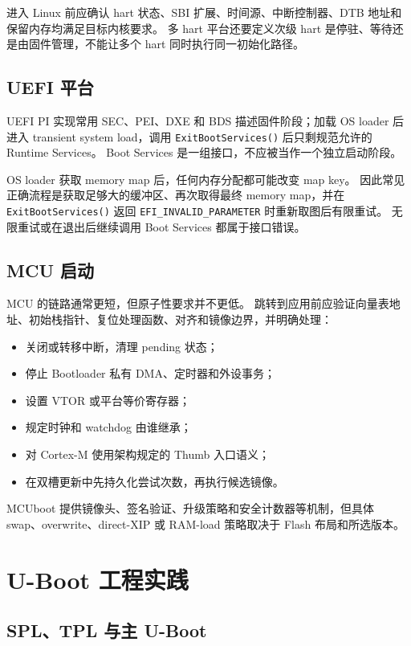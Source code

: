 进入 Linux 前应确认 hart 状态、SBI 扩展、时间源、中断控制器、DTB 地址和保留内存均满足目标内核要求\cite{linux-riscv-booting}。
多 hart 平台还要定义次级 hart 是停驻、等待还是由固件管理，不能让多个 hart 同时执行同一初始化路径。

\subsection{UEFI 平台}

UEFI PI 实现常用 SEC、PEI、DXE 和 BDS 描述固件阶段；加载 OS loader 后进入 transient system load，调用
\texttt{ExitBootServices()} 后只剩规范允许的 Runtime Services。
Boot Services 是一组接口，不应被当作一个独立启动阶段\cite{uefi-spec}。

OS loader 获取 memory map 后，任何内存分配都可能改变 map key。
因此常见正确流程是获取足够大的缓冲区、再次取得最终 memory map，并在
\texttt{ExitBootServices()} 返回 \texttt{EFI\_INVALID\_PARAMETER} 时重新取图后有限重试。
无限重试或在退出后继续调用 Boot Services 都属于接口错误。

\subsection{MCU 启动}

MCU 的链路通常更短，但原子性要求并不更低。
跳转到应用前应验证向量表地址、初始栈指针、复位处理函数、对齐和镜像边界，并明确处理：

\begin{itemize}
  \item 关闭或转移中断，清理 pending 状态；
  \item 停止 Bootloader 私有 DMA、定时器和外设事务；
  \item 设置 VTOR 或平台等价寄存器；
  \item 规定时钟和 watchdog 由谁继承；
  \item 对 Cortex-M 使用架构规定的 Thumb 入口语义；
  \item 在双槽更新中先持久化尝试次数，再执行候选镜像。
\end{itemize}

MCUboot 提供镜像头、签名验证、升级策略和安全计数器等机制，但具体 swap、overwrite、direct-XIP 或 RAM-load
策略取决于 Flash 布局和所选版本\cite{mcuboot-doc}。

\section{U-Boot 工程实践}

\subsection{SPL、TPL 与主 U-Boot}

